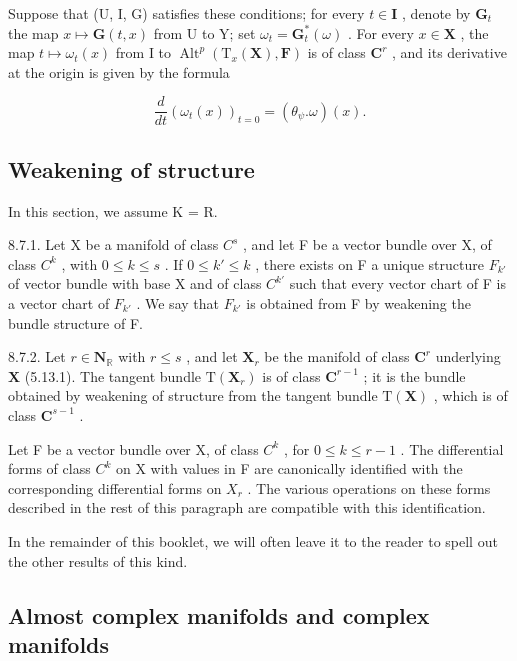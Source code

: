 Suppose that (U, I, G) satisfies these conditions; for every \(t \in \mathbf{I}\) , denote by \(\mathbf{G}_t\) the map \(x \mapsto \mathbf{G}(t, x)\) from U to Y; set \(\omega_t = \mathbf{G}_t^*(\omega)\) . For every \(x \in \mathbf{X}\) , the map \(t \mapsto \omega_t(x)\) from I to \(\operatorname{Alt}^p(\mathrm{T}_x(\mathbf{X}), \mathbf{F})\) is of class \(\mathbf{C}^r\) , and its derivative at the origin is given by the formula

\[
\frac {d}{d t} (\omega_ {t} (x)) _ {t = 0} = (\theta_ {\psi}. \omega) (x).\tag{9}
\]

\subsection{Weakening of structure}

In this section, we assume K = R.

8.7.1. Let X be a manifold of class \(C^{s}\) , and let F be a vector bundle over X, of class \(C^{k}\) , with \(0 \leqslant k \leqslant s\) . If \(0 \leqslant k' \leqslant k\) , there exists on F a unique structure \(F_{k'}\) of vector bundle with base X and of class \(C^{k'}\) such that every vector chart of F is a vector chart of \(F_{k'}\) . We say that \(F_{k'}\) is obtained from F by weakening the bundle structure of F.

8.7.2. Let \(r \in \mathbf{N}_{\mathbb{R}}\) with \(r \leqslant s\) , and let \(\mathbf{X}_r\) be the manifold of class \(\mathbf{C}^r\) underlying \(\mathbf{X}\) (5.13.1). The tangent bundle \(\mathrm{T}(\mathbf{X}_r)\) is of class \(\mathbf{C}^{r-1}\) ; it is the bundle obtained by weakening of structure from the tangent bundle \(\mathrm{T}(\mathbf{X})\) , which is of class \(\mathbf{C}^{s-1}\) .

Let F be a vector bundle over X, of class \(C^{k}\) , for \(0 \leqslant k \leqslant r - 1\) . The differential forms of class \(C^{k}\) on X with values in F are canonically identified with the corresponding differential forms on \(X_{r}\) . The various operations on these forms described in the rest of this paragraph are compatible with this identification.

In the remainder of this booklet, we will often leave it to the reader to spell out the other results of this kind.

\subsection{Almost complex manifolds and complex manifolds}

